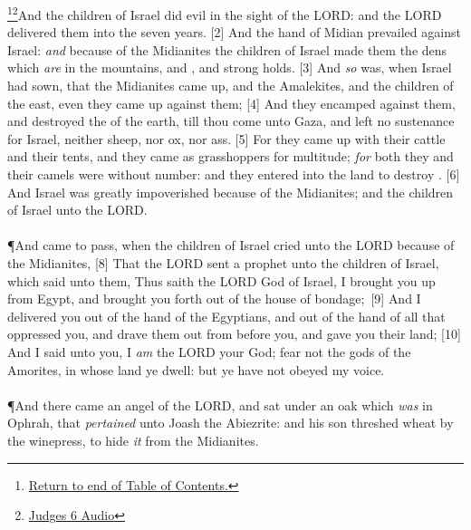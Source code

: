 \footnote{\textcolor[cmyk]{0.99998,1,0,0}{\hyperlink{TOC}{Return to end of Table of Contents.}}}\footnote{\href{https://audiobible.com/bible/judges_6.html}{\textcolor[cmyk]{0.99998,1,0,0}{Judges 6 Audio}}}\textcolor[cmyk]{0.99998,1,0,0}{And the children of Israel did evil in the sight of the LORD: and the LORD delivered them into the  seven years.}
[2] \textcolor[cmyk]{0.99998,1,0,0}{And the hand of Midian prevailed against Israel: \emph{and} because of the Midianites the children of Israel made them the dens which \emph{are} in the mountains, and , and strong holds.}
[3] \textcolor[cmyk]{0.99998,1,0,0}{And \emph{so}  was, when Israel had sown, that the Midianites came up, and the Amalekites, and the children of the east, even they came up against them;}
[4] \textcolor[cmyk]{0.99998,1,0,0}{And they encamped against them, and destroyed the  of the earth, till thou come unto Gaza, and left no sustenance for Israel, neither sheep, nor ox, nor ass.}
[5] \textcolor[cmyk]{0.99998,1,0,0}{For they came up with their cattle and their tents, and they came as grasshoppers for multitude; \emph{for} both they and their camels were without number: and they entered into the land to destroy .}
[6] \textcolor[cmyk]{0.99998,1,0,0}{And Israel was greatly impoverished because of the Midianites; and the children of Israel  unto the LORD.}\\
\\
\P \textcolor[cmyk]{0.99998,1,0,0}{And  came to pass, when the children of Israel cried unto the LORD because of the Midianites,}
[8] \textcolor[cmyk]{0.99998,1,0,0}{That the LORD sent a prophet unto the children of Israel, which said unto them, Thus saith the LORD God of Israel, I brought you up from Egypt, and brought you forth out of the house of bondage;}\
[9] \textcolor[cmyk]{0.99998,1,0,0}{And I delivered you out of the hand of the Egyptians, and out of the hand of all that oppressed you, and drave them out from before you, and gave you their land;}
[10] \textcolor[cmyk]{0.99998,1,0,0}{And I said unto you, I \emph{am} the LORD your God; fear not the gods of the Amorites, in whose land ye dwell: but ye have not obeyed my voice.}\\
\\
\P \textcolor[cmyk]{0.99998,1,0,0}{And there came an angel of the LORD, and sat under an oak which \emph{was} in Ophrah, that \emph{pertained} unto Joash the Abiezrite: and his son  threshed wheat by the winepress, to hide \emph{it} from the Midianites.}
